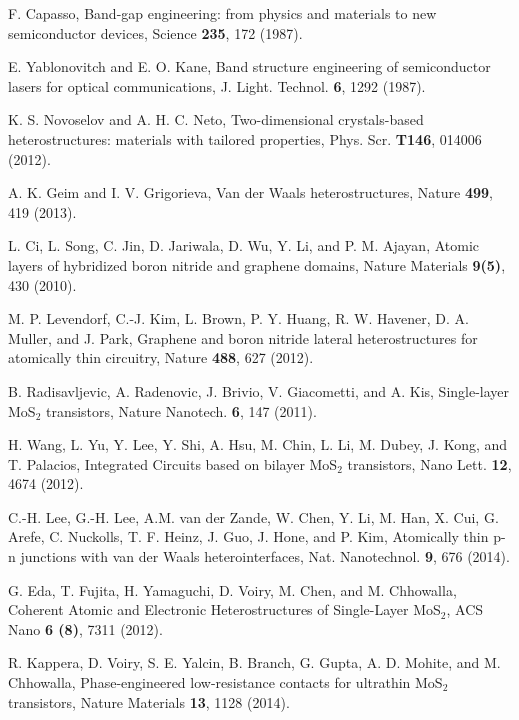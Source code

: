 \documentclass[aps,reprint,superscriptaddress,secnumarabic,amssymb,showpacs]{revtex4-1}
\begin{document}
\begin{thebibliography}{100}
 F. Capasso, 
Band-gap engineering: from physics and materials to new semiconductor devices,
Science
\textbf{235}, 172 (1987).

 E. Yablonovitch and E. O. Kane, 
Band structure engineering of semiconductor lasers for optical communications,
J. Light. Technol. \textbf{6}, 1292 (1987).

 K. S. Novoselov and A. H. C. Neto, 
Two-dimensional crystals-based heterostructures: materials with tailored properties,
Phys. Scr. \textbf{T146}, 014006 (2012).

 A. K. Geim and I. V. Grigorieva,
Van der Waals heterostructures,  
Nature \textbf{499}, 419 (2013).

 L. Ci, L. Song, C. Jin, D. Jariwala, D. Wu, Y. Li, and P. M. Ajayan, 
Atomic layers of hybridized boron nitride and graphene domains,
Nature Materials \textbf{9(5)}, 430 (2010).

 M. P. Levendorf, C.-J. Kim, L. Brown, P. Y. Huang, R. W. Havener, D. A. Muller,  and  J. Park, 
Graphene and boron nitride lateral heterostructures for atomically thin circuitry,
Nature \textbf{488}, 627 (2012). 

 B. Radisavljevic, A. Radenovic, J. Brivio, V. Giacometti, and A. Kis,
Single-layer MoS$_2$ transistors, 
Nature Nanotech. \textbf{6}, 147 (2011).

 H. Wang, L. Yu, Y. Lee, Y. Shi, A. Hsu, M. Chin, L. Li, M. Dubey, J. Kong, and T. Palacios, 
Integrated Circuits based on bilayer MoS$_2$ transistors,
Nano Lett. \textbf{12}, 4674 (2012).

 C.-H. Lee, G.-H. Lee, A.M. van der Zande, W. Chen, Y. Li, M. Han, X. Cui, G. Arefe,  C. Nuckolls, T. F. Heinz, J. Guo, J. Hone, and P. Kim, 
Atomically thin p-n junctions with van der Waals heterointerfaces,
Nat. Nanotechnol. \textbf{9}, 676 (2014).

 G. Eda, T. Fujita, H. Yamaguchi, D. Voiry, M. Chen, and M. Chhowalla, 
Coherent Atomic and Electronic Heterostructures of Single-Layer MoS$_2$,
ACS Nano \textbf{6 (8)}, 7311 (2012).

 R. Kappera, D. Voiry, S. E. Yalcin, B. Branch, G. Gupta, A. D. Mohite, and M. Chhowalla,
Phase-engineered low-resistance contacts for ultrathin MoS$_2$ transistors,
Nature Materials \textbf{13}, 1128 (2014). 


\end{thebibliography}
\end{document}
